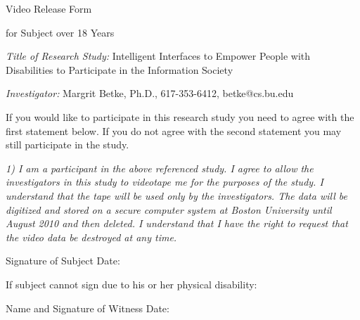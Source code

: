 \setlength{\textheight}{8.5in}
\setlength{\footheight}{0.0in}
\setlength{\topmargin}{0in}   %
\setlength{\headheight}{0.0in}
\setlength{\headsep}{0.0in}
\setlength{\textwidth}{6.6in}
\setlength{\oddsidemargin}{0in}
\setlength{\parindent}{0pc}
\setlength{\parskip}{6pt plus 1.5pt minus 1.5pt}


\signature{\vspace*{-.7cm} Margrit Betke,\\ Assistant Professor}


\pagestyle{empty}

\begin{letter}

\centerline{\Large Video Release Form}

\centerline{\large for Subject over 18 Years}


\vspace*{.5cm}

{\em Title of Research Study:}
Intelligent Interfaces to Empower People with Disabilities to
Participate in the Information Society


{\em Investigator:} Margrit Betke, Ph.D., 617-353-6412,
betke@cs.bu.edu

If you would like to participate in this research study you need to
agree with the first statement below.  If you do not agree with the
second statement you may still participate in the study.

\vspace{.5cm}


{\em 1) I am a participant in the above referenced study.  I agree to
allow the investigators in this study to videotape me for the purposes
of the study.  I understand that the tape will be used only by the
investigators.  The data will be digitized and stored on a secure
computer system at Boston University until August 2010 and then
deleted.  I understand that I have the right to request that the video
data be destroyed at any time.}

Signature of Subject \hrulefill  Date: \hrulefill

If subject cannot sign due to his or her physical disability:

Name and Signature of Witness \hrulefill  Date: \hrulefill



\end{letter}
